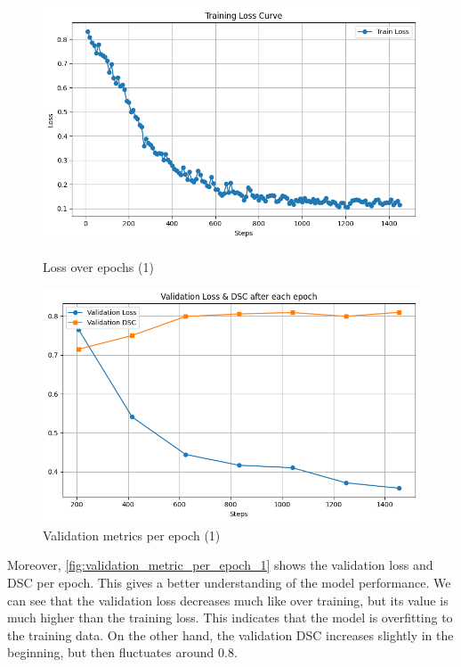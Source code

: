 \documentclass[11pt,a4paper]{article}
\begin{document}
\begin{figure}[H]
    \centering
    \begin{minipage}[t]{0.48\textwidth}
        \centering
        \includegraphics[width=\linewidth]{./img/training_loss_1.png}
        \caption{Loss over epochs (1)}
        \label{fig:training_loss_1}
    \end{minipage}
    \begin{minipage}[t]{0.48\textwidth}
        \centering
        \includegraphics[width=\linewidth]{./img/validation_metric_per_epoch_1.png}
        \caption{Validation metrics per epoch (1)}
        \label{fig:validation_metric_per_epoch_1}
    \end{minipage}
\end{figure}

Moreover, \autoref{fig:validation_metric_per_epoch_1} shows the validation loss and DSC per epoch. This gives a better understanding of the model performance. We can see that the validation loss decreases much like over training, but its value is much higher than the training loss. This indicates that the model is overfitting to the training data. On the other hand, the validation DSC increases slightly in the beginning, but then fluctuates around 0.8.
\end{document}
